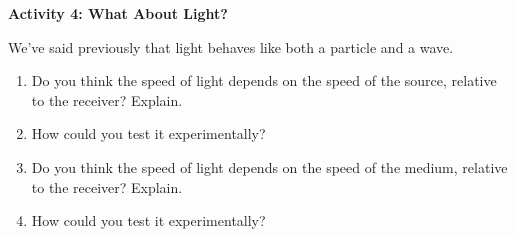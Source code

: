 \pagebreak[3]
\textbf{Activity 4: What About Light?}

We've said previously that light behaves like both a particle and a wave. 
\begin{enumerate}[labparts]
\item Do you think the speed of light depends on the speed of the source, relative to the receiver?  Explain.
\answerspace{0.8in}

\item How could you test it experimentally?
\answerspace{0.8in}

\item Do you think the speed of light depends on the speed of the medium, relative to the receiver?  Explain.
\answerspace{0.8in}

\item How could you test it experimentally?
\answerspace{0.8in}

\end{enumerate}



